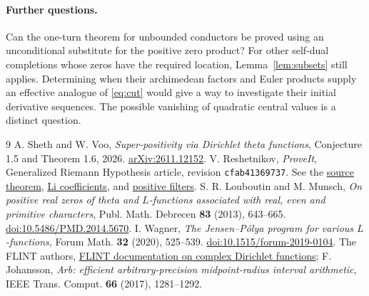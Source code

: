 \documentclass[11pt]{article}
\numberwithin{equation}{section}
\begin{document}
\paragraph{Further questions.}
Can the one-turn theorem for unbounded conductors be proved using an unconditional substitute for the positive zero product? For other self-dual completions whose zeros have the required location, Lemma~\ref{lem:subsets} still applies. Determining when their archimedean factors and Euler products supply an effective analogue of \eqref{eq:cut} would give a way to investigate their initial derivative sequences. The possible vanishing of quadratic central values is a distinct question.

\begin{thebibliography}{9}\small
{} A. Sheth and W. Voo, \emph{Super-positivity via Dirichlet theta functions}, Conjecture 1.5 and Theorem 1.6, 2026. \href{https://arxiv.org/abs/2611.12152}{arXiv:2611.12152}.
 V. Reshetnikov, \emph{ProveIt}, Generalized Riemann Hypothesis article, revision \texttt{cfab41369737}. See the \href{https://github.com/VladimirReshetnikov/ProveIt/blob/cfab41369737c66ae520d179419509eb719367cd/Analysis/GeneralizedRiemannHypothesis/Article/sections/src.tex}{source theorem}, \href{https://github.com/VladimirReshetnikov/ProveIt/blob/cfab41369737c66ae520d179419509eb719367cd/Analysis/GeneralizedRiemannHypothesis/Article/sections/li.tex}{Li coefficients}, and \href{https://github.com/VladimirReshetnikov/ProveIt/blob/cfab41369737c66ae520d179419509eb719367cd/Analysis/GeneralizedRiemannHypothesis/Article/sections/fil.tex}{positive filters}.
 S. R. Louboutin and M. Munsch, \emph{On positive real zeros of theta and $L$-functions associated with real, even and primitive characters}, Publ. Math. Debrecen \textbf{83} (2013), 643--665. \href{https://doi.org/10.5486/PMD.2014.5670}{doi:10.5486/PMD.2014.5670}.
 I. Wagner, \emph{The Jensen--P\'olya program for various $L$-functions}, Forum Math. \textbf{32} (2020), 525--539. \href{https://doi.org/10.1515/forum-2019-0104}{doi:10.1515/forum-2019-0104}.
 The FLINT authors, \href{https://flintlib.org/doc/acb_dirichlet/index.html}{FLINT documentation on complex Dirichlet functions}; F. Johansson, \emph{Arb: efficient arbitrary-precision midpoint-radius interval arithmetic}, IEEE Trans. Comput. \textbf{66} (2017), 1281--1292.
\end{thebibliography}
\end{document}
